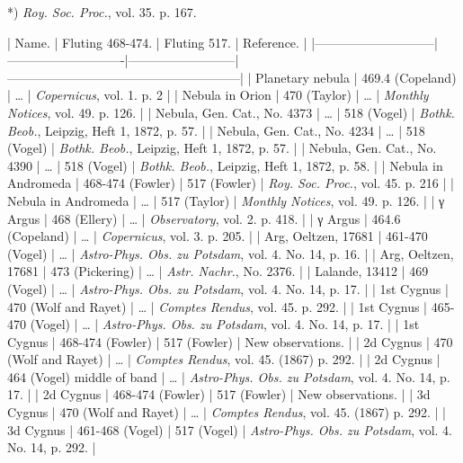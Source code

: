 \documentclass[a4paper, 12pt, oneside, polutonikogreek, english]{article}
\begin{document}
*) \emph{Roy. Soc. Proc.}, vol. 35. p. 167.

| Name.            | Fluting 468-474.      | Fluting 517.       | Reference.                       |
|-----------------------------|----------------------------|--------------------------|--------------------------------------------------------|
| Planetary nebula      | 469.4 (Copeland)      | …            | \emph{Copernicus}, vol. 1. p. 2               |
| Nebula in Orion       | 470 (Taylor)        | …            | \emph{Monthly Notices}, vol. 49. p. 126.          |
| Nebula, Gen. Cat., No. 4373 | …             | 518 (Vogel)       | \emph{Bothk. Beob.}, Leipzig, Heft 1, 1872, p. 57.     |
| Nebula, Gen. Cat., No. 4234 | …             | 518 (Vogel)       | \emph{Bothk. Beob.}, Leipzig, Heft 1, 1872, p. 57.     |
| Nebula, Gen. Cat., No. 4390 | …             | 518 (Vogel)       | \emph{Bothk. Beob.}, Leipzig, Heft 1, 1872, p. 58.     |
| Nebula in Andromeda     | 468-474 (Fowler)      | 517 (Fowler)       | \emph{Roy. Soc. Proc.}, vol. 45. p. 216           |
| Nebula in Andromeda     | …             | 517 (Taylor)       | \emph{Monthly Notices}, vol. 49. p. 126.          |
| γ Argus           | 468 (Ellery)        | …            | \emph{Observatory}, vol. 2. p. 418.             |
| γ Argus           | 464.6 (Copeland)      | …            | \emph{Copernicus}, vol. 3. p. 205.             |
| Arg, Oeltzen, 17681     | 461-470 (Vogel)      | …            | \emph{Astro-Phys. Obs. zu Potsdam}, vol. 4. No. 14, p. 16. |
| Arg, Oeltzen, 17681     | 473 (Pickering)      | …            | \emph{Astr. Nachr.}, No. 2376.               |
| Lalande, 13412       | 469 (Vogel)        | …            | \emph{Astro-Phys. Obs. zu Potsdam}, vol. 4. No. 14, p. 17. |
| 1st Cygnus         | 470 (Wolf and Rayet)    | …            | \emph{Comptes Rendus}, vol. 45. p. 292.           |
| 1st Cygnus         | 465-470 (Vogel)      | …            | \emph{Astro-Phys. Obs. zu Potsdam}, vol. 4. No. 14, p. 17. |
| 1st Cygnus         | 468-474 (Fowler)      | 517 (Fowler)       | New observations.                   |
| 2d Cygnus          | 470 (Wolf and Rayet)    | …            | \emph{Comptes Rendus}, vol. 45. (1867) p. 292.       |
| 2d Cygnus          | 464 (Vogel) middle of band | …            | \emph{Astro-Phys. Obs. zu Potsdam}, vol. 4. No. 14, p. 17. |
| 2d Cygnus          | 468-474 (Fowler)      | 517 (Fowler)       | New observations.                   |
| 3d Cygnus          | 470 (Wolf and Rayet)    | …            | \emph{Comptes Rendus}, vol. 45. (1867) p. 292.       |
| 3d Cygnus          | 461-468 (Vogel)      | 517 (Vogel)       | \emph{Astro-Phys. Obs. zu Potsdam}, vol. 4. No. 14, p. 292. |
\end{document}
